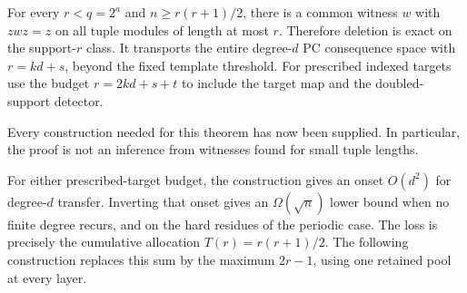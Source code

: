 \begin{theorem}
For every $r<q=2^a$ and $n\ge r(r+1)/2$, there is a common witness $w$ with $zwz=z$ on all tuple modules of length at most $r$. Therefore deletion is exact on the support-$r$ class. It transports the
entire degree-$d$ PC consequence space with $r=kd+s$, beyond the fixed
template threshold. For prescribed indexed targets use the budget
$r=2kd+s+t$ to include the target map and the doubled-support detector.
\end{theorem}
Every construction needed for this theorem has now been supplied. In particular, the proof is not an inference from witnesses found for small tuple lengths.


\begin{remark}
For either prescribed-target budget, the construction gives an onset
$O(d^2)$ for degree-$d$ transfer.
Inverting that onset gives an $\Omega(\sqrt n)$ lower bound when no
finite degree recurs, and on the hard residues of the periodic case.
The loss is precisely the cumulative allocation $T(r)=r(r+1)/2$.
The following construction replaces this sum by the maximum $2r-1$,
using one retained pool at every layer.
\end{remark}
